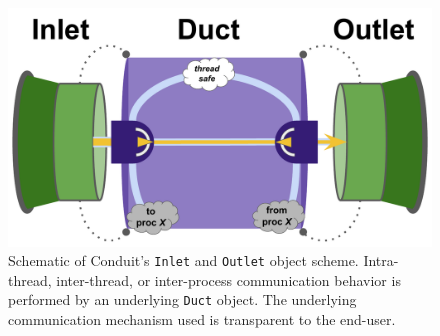    \begin{figure}[thpb]
      \centering
      \includegraphics[width=0.8\linewidth]{img/conduit}
      \caption{Schematic of Conduit's \texttt{Inlet} and \texttt{Outlet} object scheme.
      Intra-thread, inter-thread, or inter-process communication behavior is performed by an underlying \texttt{Duct} object.
      The underlying communication mechanism used is transparent to the end-user.
      }
      \label{fig:conduit}
   \end{figure}